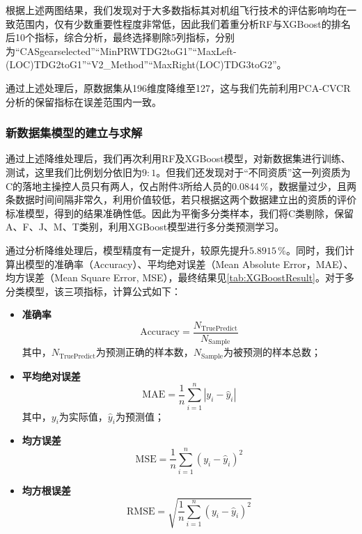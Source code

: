 \documentclass{MathorCupModeling}
\begin{document}
	根据上述两图结果，我们发现对于大多数指标其对机组飞行技术的评估影响均在一致范围内，仅有少数重要性程度非常低，因此我们着重分析RF与XGBoost的排名后10个指标，综合分析，最终选择剔除5列指标，分别为“CASgearselected”“MinPRWTDG2toG1”“MaxLeft-\\(LOC)TDG2toG1”“V2\_Method”“MaxRight(LOC)TDG3toG2”。

	通过上述处理后，原数据集从196维度降维至127，这与我们先前利用PCA-CVCR分析的保留指标在误差范围内一致。

	\subsubsection{新数据集模型的建立与求解}
	通过上述降维处理后，我们再次利用RF及XGBoost模型，对新数据集进行训练、测试，这里我们比例划分依旧为$9:1$。但我们还发现对于“不同资质”这一列资质为C的落地主操控人员只有两人，仅占附件3所给人员的$0.0844\,\%$，数据量过少，且两条数据时间间隔非常久，利用价值较低，若只根据这两个数据建立出的资质的评价标准模型，得到的结果准确性低。因此为平衡多分类样本，我们将C类剔除，保留A、F、J、M、T类别，利用XGBoost模型进行多分类预测学习。

	通过分析降维处理后，模型精度有一定提升，较原先提升$5.8915\,\%$。同时，我们计算出模型的准确率（Accuracy）、平均绝对误差（Mean Absolute Error，MAE）、均方误差（Mean Square Error, MSE），最终结果见\textcolor{blue}{\cref{tab:XGBoostResult}}。对于多分类模型，该三项指标，计算公式如下：
\begin{itemize}
	\item \textbf{准确率}
		\begin{equation}
		\mathrm{Accuracy}=\frac{N_{\mathrm{TruePredict}}}{N_{\mathrm{Sample}}} \label{Accuracy}
		\end{equation}
	其中，$N_{\mathrm{TruePredict}}$为预测正确的样本数，$N_{\mathrm{Sample}}$为被预测的样本总数；
	\item \textbf{平均绝对误差}
		\begin{equation}
		\mathrm{MAE}=\frac{1}{n}\sum_{i=1}^{n}\left|y_{i}-\hat{y}_{i}\right| \label{MAE}
		\end{equation}
	其中，$y_i$为实际值，$\hat{y}_i$为预测值；
	\item \textbf{均方误差}
		\begin{equation}
		\mathrm{MSE}=\frac{1}{n}\sum_{i=1}^{n}\left(y_{i}-\hat{y}_{i}\right)^{2} \label{MSE}
		\end{equation}
	\item \textbf{均方根误差}
		\begin{equation}
		\mathrm{RMSE}=\sqrt{\frac{1}{n}\sum_{i=1}^{n}\left(y_{i}-\hat{y}_{i}\right)^{2}} \label{RMSE}
		\end{equation}
\end{itemize}
\end{document}
